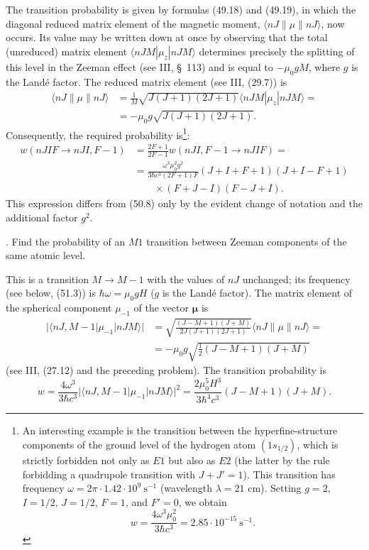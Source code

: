 \SolutionHeading The transition probability is given by formulas (49.18) and (49.19), in which the diagonal reduced matrix element of the magnetic moment, $\langle nJ\|\mu\|nJ\rangle$, now occurs. Its value may be written down at once by observing that the total (unreduced) matrix element $\langle nJM|\mu_z|nJM\rangle$ determines precisely the splitting of this level in the Zeeman effect (see III, \S~113) and is equal to $-\mu_0gM$, where $g$ is the Landé factor. The reduced matrix element (see III, (29.7)) is
\[
\begin{aligned}
\langle nJ\|\mu\|nJ\rangle
&=\frac1M\sqrt{J(J+1)(2J+1)}
\langle nJM|\mu_z|nJM\rangle={}\\
&=-\mu_0g\sqrt{J(J+1)(2J+1)}.
\end{aligned}
\]
Consequently, the required probability is\footnote{An interesting example is the transition between the hyperfine-structure components of the ground level of the hydrogen atom $(1s_{1/2})$, which is strictly forbidden not only as $E1$ but also as $E2$ (the latter by the rule forbidding a quadrupole transition with $J+J'=1$). This transition has frequency $\omega=2\pi\cdot1.42\cdot10^9\ \mathrm{s}^{-1}$ (wavelength $\lambda=21$ cm). Setting $g=2$, $I=1/2$, $J=1/2$, $F=1$, and $F'=0$, we obtain
\[
w=\frac{4\omega^3\mu_0^2}{3\hbar c^3}
=2.85\cdot10^{-15}\ \mathrm{s}^{-1}.
\]}:
\[
\begin{aligned}
w(nJIF\to nJI,F-1)
&=\frac{2F+1}{2F-1}w(nJI,F-1\to nJIF)={}\\
&=\frac{\omega^3\mu_0^2g^2}{3\hbar c^3(2F+1)F}
(J+I+F+1)(J+I-F+1)\\
&\qquad{}\times(F+J-I)(F-J+I).
\end{aligned}
\]
This expression differs from (50.8) only by the evident change of notation and the additional factor $g^2$.

. Find the probability of an $M1$ transition between Zeeman components of the same atomic level.

\SolutionHeading This is a transition $M\to M-1$ with the values of $nJ$ unchanged; its frequency (see below, (51.3)) is $\hbar\omega=\mu_0gH$ ($g$ is the Landé factor). The matrix element of the spherical component $\mu_{-1}$ of the vector $\boldsymbol\mu$ is
\[
\begin{aligned}
|\langle nJ,M-1|\mu_{-1}|nJM\rangle|
&=\sqrt{\frac{(J-M+1)(J+M)}{2J(J+1)(2J+1)}}
\langle nJ\|\mu\|nJ\rangle={}\\
&=-\mu_0g\sqrt{\frac12(J-M+1)(J+M)}
\end{aligned}
\]
(see III, (27.12) and the preceding problem). The transition probability is
\[
w=\frac{4\omega^3}{3\hbar c^3}
|\langle nJ,M-1|\mu_{-1}|nJM\rangle|^2
=\frac{2\mu_0^5H^3}{3\hbar^4c^3}(J-M+1)(J+M).
\]
